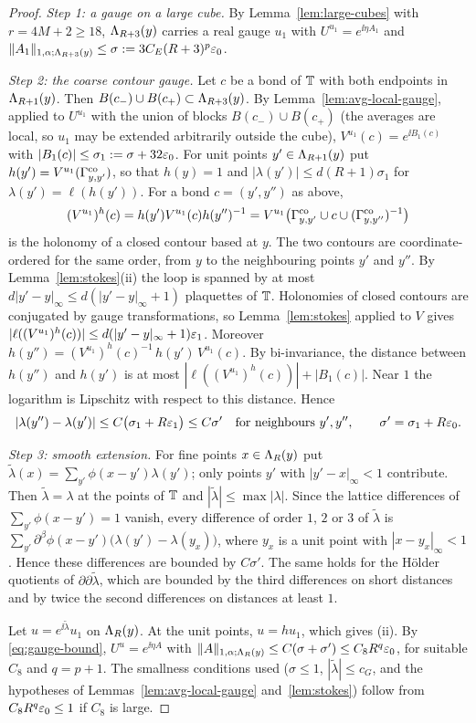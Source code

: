 \begin{proof}
\emph{Step 1: a gauge on a large cube.} By Lemma~\ref{lem:large-cubes} with $r=4M+2\ge18$, $\Lambda_{R+3}(y)$ carries a real gauge $u_1$ with $U^{u_1}=e^{\ii\eta A_1}$ and $\|A_1\|_{1,\alpha;\Lambda_{R+3}(y)}\le\sigma:=3C_E(R+3)^p\varepsilon_0$.

\emph{Step 2: the coarse contour gauge.} Let $c$ be a bond of $\mathbb T$ with both endpoints in $\Lambda_{R+1}(y)$. Then $B(c_-)\cup B(c_+)\subset\Lambda_{R+3}(y)$. By Lemma~\ref{lem:avg-local-gauge}, applied to $U^{u_1}$ with the union of blocks $B(c_-)\cup B(c_+)$ (the averages are local, so $u_1$ may be extended arbitrarily outside the cube), $V^{u_1}(c)=e^{\ii B_1(c)}$ with $|B_1(c)|\le\sigma_1:=\sigma+32\varepsilon_0$. For unit points $y'\in\Lambda_{R+1}(y)$ put $h(y')=V^{u_1}(\Gamma^{\rm co}_{y,y'})$, so that $h(y)=1$ and $|\lambda(y')|\le d(R+1)\sigma_1$ for $\lambda(y')=\ell(h(y'))$. For a bond $c=(y',y'')$ as above,
\[
(V^{u_1})^h(c)=h(y')V^{u_1}(c)h(y'')^{-1}=V^{u_1}\big(\Gamma^{\rm co}_{y,y'}\cup c\cup(\Gamma^{\rm co}_{y,y''})^{-1}\big)
\]
is the holonomy of a closed contour based at $y$. The two contours are coordinate-ordered for the same order, from $y$ to the neighbouring points $y'$ and $y''$. By Lemma~\ref{lem:stokes}(ii) the loop is spanned by at most $d|y'-y|_\infty\le d(|y'-y|_\infty+1)$ plaquettes of $\mathbb T$. Holonomies of closed contours are conjugated by gauge transformations, so Lemma~\ref{lem:stokes} applied to $V$ gives $|\ell((V^{u_1})^h(c))|\le d(|y'-y|_\infty+1)\varepsilon_1$. Moreover $h(y'')=(V^{u_1})^h(c)^{-1}\,h(y')\,V^{u_1}(c)$. By bi-invariance, the distance between $h(y'')$ and $h(y')$ is at most $|\ell((V^{u_1})^h(c))|+|B_1(c)|$. Near $1$ the logarithm is Lipschitz with respect to this distance. Hence
\[
|\lambda(y'')-\lambda(y')|\le C\big(\sigma_1+R\varepsilon_1\big)\le C\sigma'\quad\text{for neighbours }y',y'',\qquad\sigma'=\sigma_1+R\varepsilon_0 .
\]

\emph{Step 3: smooth extension.} For fine points $x\in\Lambda_R(y)$ put $\tilde\lambda(x)=\sum_{y'}\phi(x-y')\lambda(y')$; only points $y'$ with $|y'-x|_\infty<1$ contribute. Then $\tilde\lambda=\lambda$ at the points of $\mathbb T$ and $|\tilde\lambda|\le\max|\lambda|$. Since the lattice differences of $\sum_{y'}\phi(x-y')=1$ vanish, every difference of order $1$, $2$ or $3$ of $\tilde\lambda$ is $\sum_{y'}\partial^\beta\phi(x-y')\big(\lambda(y')-\lambda(y_x)\big)$, where $y_x$ is a unit point with $|x-y_x|_\infty<1$. Hence these differences are bounded by $C\sigma'$. The same holds for the H\"older quotients of $\partial\partial\tilde\lambda$, which are bounded by the third differences on short distances and by twice the second differences on distances at least $1$.

Let $u=e^{\ii\tilde\lambda}u_1$ on $\Lambda_R(y)$. At the unit points, $u=hu_1$, which gives (ii). By \eqref{eq:gauge-bound}, $U^u=e^{\ii\eta A}$ with $\|A\|_{1,\alpha;\Lambda_R(y)}\le C(\sigma+\sigma')\le C_8R^q\varepsilon_0$, for suitable $C_8$ and $q=p+1$. The smallness conditions used ($\sigma\le1$, $|\tilde\lambda|\le c_G$, and the hypotheses of Lemmas~\ref{lem:avg-local-gauge} and~\ref{lem:stokes}) follow from $C_8R^q\varepsilon_0\le1$ if $C_8$ is large.
\end{proof}

